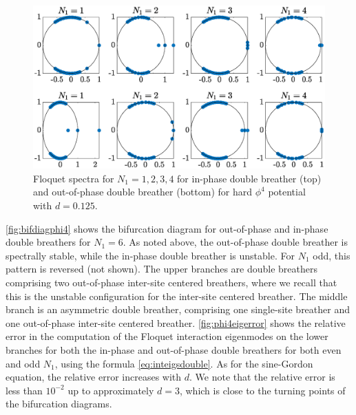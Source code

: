 \documentclass[12pt,reqno]{amsart}
\theoremstyle{definition}
\begin{document}
\begin{figure}
	\includegraphics[width=15cm]{phi4hardfloqplot.eps}
	\caption{Floquet spectra for $N_1 = 1, 2, 3, 4$ for in-phase double breather (top) and out-of-phase double breather (bottom) for hard $\phi^4$ potential with $d = 0.125$.}
	\label{fig:phi4hardfloqplot}
\end{figure}

\cref{fig:bifdiagphi4} shows the bifurcation diagram for out-of-phase and in-phase double breathers for $N_1 = 6$. As noted above, the out-of-phase double breather is spectrally stable, while the in-phase double breather is unstable. For $N_1$ odd, this pattern is reversed (not shown). The upper branches are double breathers comprising two out-of-phase inter-site centered breathers, where we recall that this is the unstable configuration for the inter-site centered breather. The middle branch is an asymmetric double breather, comprising one single-site breather and one out-of-phase inter-site centered breather. \cref{fig:phi4eigerror} shows the relative error in the computation of the Floquet interaction eigenmodes on the lower branches for both the in-phase and out-of-phase double breathers for both even and odd $N_1$, using the formula \cref{eq:inteigsdouble}. As for the sine-Gordon equation, the relative error increases with $d$. We note that the relative error is less than $10^{-2}$ up to approximately $d = 3$, which is close to the turning points of the bifurcation diagrams. 
\end{document}
